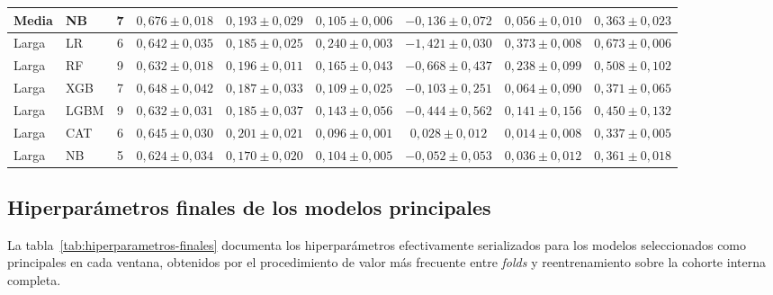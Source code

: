 \documentclass[
  spanish,
  a4paper,
  12pt,
  twoside]{memoir}
\begin{document}
\begin{table}[htbp]
{\begin{tabular}{l l c c c c c c c}
    Media & NB        & 7 & $0{,}676 \pm 0{,}018$ & $0{,}193 \pm 0{,}029$ & $0{,}105 \pm 0{,}006$ & $-0{,}136 \pm 0{,}072$ & $0{,}056 \pm 0{,}010$ & $0{,}363 \pm 0{,}023$ \\
    \midrule
    Larga & LR   & 6 & $0{,}642 \pm 0{,}035$ & $0{,}185 \pm 0{,}025$ & $0{,}240 \pm 0{,}003$ & $-1{,}421 \pm 0{,}030$ & $0{,}373 \pm 0{,}008$ & $0{,}673 \pm 0{,}006$ \\
    Larga & RF   & 9 & $0{,}632 \pm 0{,}018$ & $0{,}196 \pm 0{,}011$ & $0{,}165 \pm 0{,}043$ & $-0{,}668 \pm 0{,}437$ & $0{,}238 \pm 0{,}099$ & $0{,}508 \pm 0{,}102$ \\
    Larga & XGB  & 7 & $0{,}648 \pm 0{,}042$ & $0{,}187 \pm 0{,}033$ & $0{,}109 \pm 0{,}025$ & $-0{,}103 \pm 0{,}251$ & $0{,}064 \pm 0{,}090$ & $0{,}371 \pm 0{,}065$ \\
    Larga & LGBM & 9 & $0{,}632 \pm 0{,}031$ & $0{,}185 \pm 0{,}037$ & $0{,}143 \pm 0{,}056$ & $-0{,}444 \pm 0{,}562$ & $0{,}141 \pm 0{,}156$ & $0{,}450 \pm 0{,}132$ \\
    Larga & CAT  & 6 & $0{,}645 \pm 0{,}030$ & $0{,}201 \pm 0{,}021$ & $0{,}096 \pm 0{,}001$ & $0{,}028 \pm 0{,}012$ & $0{,}014 \pm 0{,}008$ & $0{,}337 \pm 0{,}005$ \\
    Larga & NB   & 5 & $0{,}624 \pm 0{,}034$ & $0{,}170 \pm 0{,}020$ & $0{,}104 \pm 0{,}005$ & $-0{,}052 \pm 0{,}053$ & $0{,}036 \pm 0{,}012$ & $0{,}361 \pm 0{,}018$ \\
    \bottomrule
  \end{tabular}%
  }
\end{table}

\subsection*{Hiperparámetros finales de los modelos principales}

La tabla~\ref{tab:hiperparametros-finales} documenta los hiperparámetros efectivamente serializados para los modelos seleccionados como principales en cada ventana, obtenidos por el 
procedimiento de valor más frecuente entre \emph{folds} y reentrenamiento sobre la cohorte interna completa.
\end{document}

